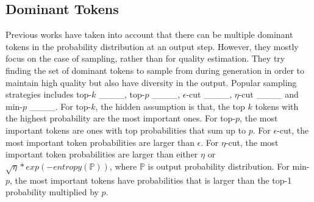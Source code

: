 \subsection{Dominant Tokens} \label{sec:sampling}
Previous works have taken into account that there can be multiple dominant tokens in the probability distribution at an output step. However, they mostly focus on the case of sampling, rather than for quality estimation. They try finding the set of dominant tokens to sample from during generation in order to maintain high quality but also have diversity in the output. Popular sampling strategies includes top-$k$ ____, top-$p$ ____, $\epsilon$-cut ____, $\eta$-cut ____ and min-$p$ ____. For top-$k$, the hidden assumption is that, the top $k$ tokens with the highest probability are the most important ones. For top-$p$, the most important tokens are ones with top probabilities that sum up to $p$. 
For $\epsilon$-cut, the most important token probabilities are larger than $\epsilon$. 
For $\eta$-cut, the most important token probabilities are larger than either $\eta$ or $\sqrt{\eta} * exp(-entropy(\mathbb{P}))$, where $\mathbb{P}$ is output probability distribution.
For min-$p$, the most important tokens have probabilities that is larger than the top-1 probability multiplied by $p$.


